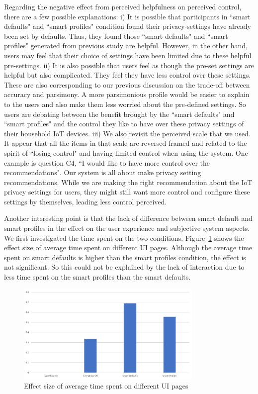Regarding the negative effect from perceived helpfulness on perceived control, there are a few possible explanations: i) It is possible that participants in ``smart defaults" and ``smart profiles" condition found their privacy-settings have already been set by defaults. Thus, they found those ``smart defaults" and ``smart profiles" generated from previous study are helpful. However, in the other hand, users may feel that their choice of settings have been limited due to these helpful pre-settings. ii) It is also possible that users feel as though the pre-set settings are helpful but also complicated. They feel they have less control over these settings. These are also corresponding to our previous discussion on the trade-off between accuracy and parsimony. A more parsimonious profile would be easier to explain to the users and also make them less worried about the pre-defined settings. So users are debating between the benefit brought by the ``smart defaults" and ``smart profiles" and the control they like to have over these privacy settings of their household IoT devices.
iii) We also revisit the perceived scale that we used. It appear that all the items in that scale are reversed framed and related to the spirit of ``losing control" and having limited control when using the system. One example is question C4, ``I would like to have more control over the recommendations". Our system is all about make privacy setting recommendations. While we are making the right recommendation about the IoT privacy settings for users, they might still want more control and configure these settings by themselves, leading less control perceived.

Another interesting point is that the lack of difference between smart default and smart profiles in the effect on the user experience and subjective system aspects. We first investigated the time spent on the two conditions. Figure~\ref{fig:timeonui} shows the effect size of average time spent on different UI pages. Although the average time spent on smart defaults is higher than the smart profiles condition, the effect is not significant. So this could not be explained by the lack of interaction due to less time spent on the smart profiles than the smart defaults.

\begin{figure}
	\centering
	\includegraphics[width=0.8\textwidth]{figures/timeonui.png}
	\caption{Effect size of average time spent on different UI pages}
	\label{fig:timeonui}
\end{figure}

